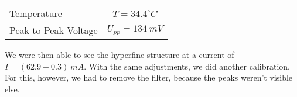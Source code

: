 \begin{center}
\begin{tabular}[H]{l c}
Temperature & $T=34.4 ^\circ C$\\
Peak-to-Peak Voltage & $U_{pp} = 134\ mV$\\
\end{tabular}
\end{center}

We were then able to see the hyperfine structure at a current of $I = (62.9 \pm 0.3)\ mA$. With the same adjustments, we did another calibration. For this, however, we had to remove the filter, because the peaks weren't visible else.